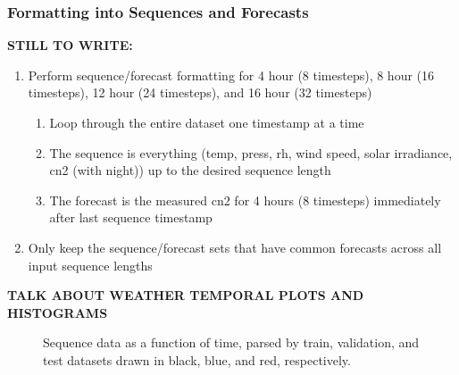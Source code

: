 \subsubsection{Formatting into Sequences and Forecasts}
\textbf{STILL TO WRITE:}
\begin{enumerate}
	\item Perform sequence/forecast formatting for 4 hour (8 timesteps), 8 hour (16 timesteps), 12 hour (24 timesteps), and 16 hour (32 timesteps)
	\begin{enumerate}
		\item Loop through the entire dataset one timestamp at a time
		\item The sequence is everything (temp, press, rh, wind speed, solar irradiance, cn2 (with night)) up to the desired sequence length
		\item The forecast is the measured cn2 for 4 hours (8 timesteps) immediately after last sequence timestamp
	\end{enumerate}
	\item Only keep the sequence/forecast sets that have common forecasts across all input sequence lengths
\end{enumerate}

\textbf{TALK ABOUT WEATHER TEMPORAL PLOTS AND HISTOGRAMS}
\label{sec:wx_seq_hist}
\begin{figure}[p!]
	\centering
	\hfill
	\hfill
	\hfill
	\caption{Sequence data as a function of time, parsed by train, validation, and test datasets drawn in black, blue, and red, respectively.}
	\label{fig:sequence_temporal}
\end{figure}

